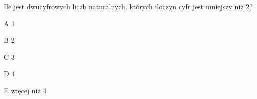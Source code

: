 \begin{tresc}
Ile jest dwucyfrowych liczb naturalnych, których iloczyn cyfr jest mniejszy niż 2?
\end{tresc}
\begin{wariant}{A} 1 \end{wariant}
\begin{wariant}{B} 2 \end{wariant}
\begin{wariant}{C} 3 \end{wariant}
\begin{wariant}{D} 4 \end{wariant}
\begin{wariant}{E} więcej niż 4 \end{wariant}

